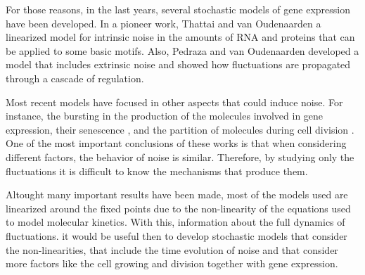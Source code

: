 For those reasons, in the last years, several stochastic models of gene expression have been developed. In a pioneer work, Thattai and van Oudenaarden \cite{thattai01} a linearized model for intrinsic noise in the amounts of RNA and proteins that can be applied to some basic motifs. Also, Pedraza and van Oudenaarden \cite{pedraza05} developed a model that includes extrinsic noise and showed how fluctuations are propagated through a cascade of regulation.

Most recent models have focused in other aspects that could induce noise. For instance, the bursting in the production of the molecules involved in gene expression, their senescence \cite{pedraza08}, and the partition of molecules during cell division \cite{huh11a} \cite{huh11b}. One of the most important conclusions of these works is that when considering different factors, the behavior of noise is similar. Therefore, by studying only the fluctuations it is difficult to know the mechanisms that produce them.

Altought many important results have been made, most of the models used are linearized around the fixed points due to the non-linearity of the equations used to model molecular kinetics. With this, information about the full dynamics of fluctuations. it would be useful then to develop stochastic models that consider the non-linearities, that include the time evolution of noise and that consider more factors like the cell growing and division together with gene expression.
